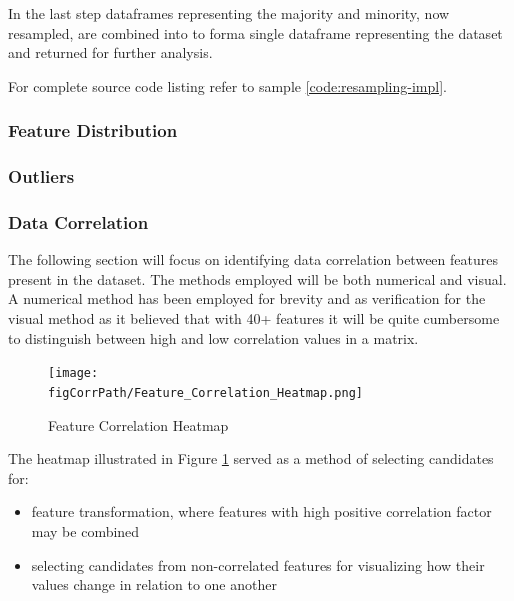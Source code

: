 In the last step dataframes representing the majority and minority, now resampled, are combined into to forma single dataframe representing the dataset and returned for further analysis.


For complete source code listing refer to sample \ref{code:resampling-impl}.


\subsubsection{Feature Distribution}\label{sec:impl-data-analysis:feature-dist}

\subsubsection{Outliers}\label{sec:impl-data-analysis:outliers}

\subsubsection{Data Correlation}\label{sec:impl-data-analysis:corr:generic-approach}
The following section will focus on identifying data correlation between features present in the dataset. The methods employed will be both numerical and visual. A numerical method has been employed for brevity and as verification for the visual method as it believed that with 40+ features it will be quite cumbersome to distinguish between high and low correlation values in a matrix.

\begin{figure}
    \texttt{[image: \\figCorrPath/Feature\_Correlation\_Heatmap.png]}
    \caption{Feature Correlation Heatmap}
    \label{fig:correlation-all-features}
\end{figure}


The heatmap illustrated in Figure \ref{fig:correlation-all-features} served as a method of selecting candidates for:
\begin{itemize}
    \item feature transformation, where features with high positive correlation factor may be combined 
    \item selecting candidates from non-correlated features for visualizing how their values change in relation to one another
\end{itemize}

